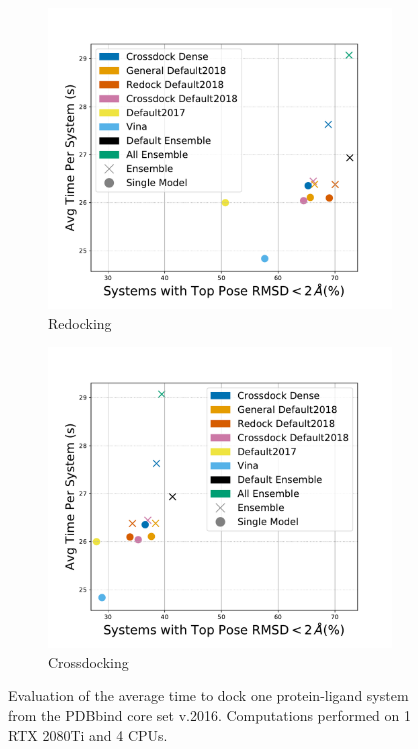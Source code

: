 \documentclass[journal=jcisd8,manuscript=article]{achemso}
\begin{document}
\begin{figure}    
        \begin{subfigure}[b]{0.48\textwidth}
                \centering
                \includegraphics[width=\textwidth]{figures/redocking/gpu_models_line_rescore.pdf}
                \caption{Redocking}
                \label{fig:OptimalRescRD}
        \end{subfigure}    
        \begin{subfigure}[b]{0.48\textwidth}
                \centering
                \includegraphics[width=\textwidth]{figures/crossdocking/gpu_models_line_rescore.pdf}
                \caption{Crossdocking}
                \label{fig:OptimalRescCD}
        \end{subfigure}    
        \caption{Evaluation of the average time to dock one protein-ligand system from the PDBbind core set v.2016. Computations performed on 1 RTX 2080Ti and 4 CPUs. }
        \label{fig:OptimalRescore}
\end{figure}    
\end{document}
